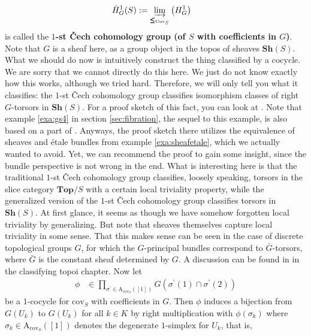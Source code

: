 \begin{exa}
\begin{align*}
  \check{H}_{G}^{1}(S)
  &:=
  \varinjlim_{\pmb{\leq}_{\mathrm{Cov}_{S}}}
  \left(
    H_{G}^{1}
  \right)
\end{align*}
is called the \textbf{$1$-st \v{C}ech cohomology group (of $S$ with coefficients in $G$)}.
Note that $G$ is a sheaf here, as a group object in the topos of sheaves $\mathbf{Sh}(S)$.
What we should do now is intuitively construct the thing classified by a cocycle.
We are sorry that we cannot directly do this here.
We just do not know exactly how this works, although we tried hard.
Therefore, we will only tell you what it classifies: the $1$-st \v{C}ech cohomology group classifies isomorphism classes of right $G$-torsors in $\mathbf{Sh}(S)$.
For a proof sketch of this fact, you can look at \cite{c82f5e22}.
Note that example \ref{exa:gs4} in section \ref{sec:fibration}, the sequel to this example, is also based on a part of \cite{c82f5e22}.
Anyways, the proof sketch there utilizes the equivalence of sheaves and \'{e}tale bundles from example \ref{exa:sheafetale}, which we actually wanted to avoid.
Yet, we can recommend the proof to gain some insight, since the bundle perspective is not wrong in the end.
What is interesting here is that the traditional $1$-st \v{C}ech cohomology group classifies, loosely speaking, torsors in the slice category $\mathbf{Top} \slash S$ with a certain local triviality property, while the generalized version of the $1$-st \v{C}ech cohomology group classifies torsors in $\mathbf{Sh}(S)$.
At first glance, it seems as though we have somehow forgotten local triviality by generalizing.
But note that sheaves themselves capture local triviality in some sense.
That this makes sense can be seen in the case of discrete topological groups $G$, for which the $G$-principal bundles correspond to $\bar{G}$-torsors, where $\bar{G}$ is the constant sheaf determined by $G$.
A discussion can be found in \cite{c55c71e8} in the classifying topoi chapter.
\iffalse
Now let
\begin{align*}
  \phi
  &\in
  \prod_{\sigma^{\backprime} \in \mathrm{A}_{\mathrm{cov}_{S}}([1])}
  G(\sigma^{\backprime}(1) \cap \sigma^{\backprime}(2))
\end{align*}
be a $1$-cocycle for $\mathrm{cov}_{S}$ with coefficients in $G$.
Then $\phi$ induces a bijection from $G(U_{k})$ to $G(U_{k})$ for all $k \in K$ by right multiplication with $\phi(\sigma_{k})$ where $\sigma_{k} \in \mathrm{A}_{\mathrm{cov}_{S}}([1])$ denotes the degenerate $1$-simplex for $U_{k}$, that is,
\begin{align*}

\end{align*}
\end{exa}
